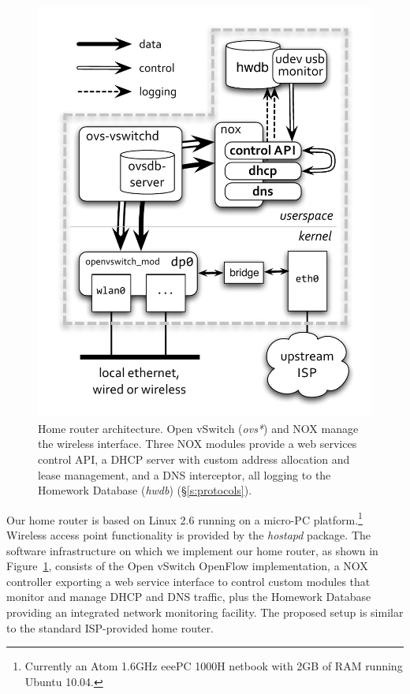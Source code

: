 \begin{figure} \centering \includegraphics[width=0.9\columnwidth]{architecture}
  \caption{\label{f:architecture}Home router architecture.  Open vSwitch
    (\emph{ovs*}) and NOX manage the wireless interface.  Three NOX modules
    provide a web services control API, a DHCP server with custom address
    allocation and lease management, and a DNS interceptor, all logging to the
    Homework Database (\emph{hwdb}) (\S\ref{s:protocols}). 
}\end{figure}

Our home router is based on Linux 2.6 running on a micro-PC
platform.\footnote{Currently an Atom 1.6GHz eeePC 1000H netbook with 2GB of RAM
  running Ubuntu 10.04.} Wireless access point functionality is provided by the
\emph{hostapd} package.  The software infrastructure on which we implement our
home router, as shown in Figure~\ref{f:architecture}, consists of the Open
vSwitch OpenFlow implementation, a NOX controller exporting a web service
interface to control custom modules that monitor and manage DHCP and DNS
traffic, plus the Homework
Database~\cite{sventek11:_infor_plane_archit_suppor_home_networ_manag} providing
an integrated network monitoring facility. The proposed setup is similar to the
standard ISP-provided home router.
 
